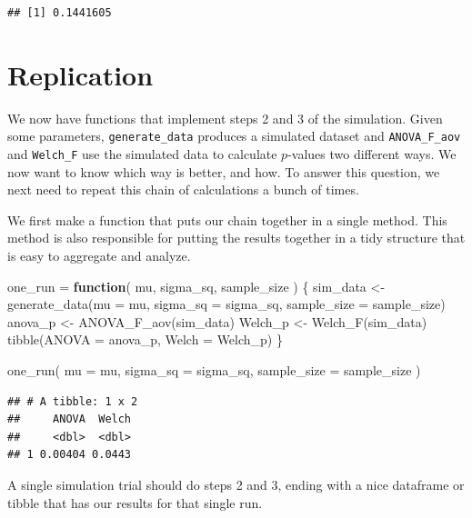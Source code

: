 \documentclass[
]{book}
\newenvironment{Shaded}{\begin{snugshade}}{\end{snugshade}}
\newcommand{\AttributeTok}[1]{\textcolor[rgb]{0.77,0.63,0.00}{#1}}
\newcommand{\ControlFlowTok}[1]{\textcolor[rgb]{0.13,0.29,0.53}{\textbf{#1}}}
\newcommand{\FunctionTok}[1]{\textcolor[rgb]{0.00,0.00,0.00}{#1}}
\newcommand{\NormalTok}[1]{#1}
\newcommand{\OtherTok}[1]{\textcolor[rgb]{0.56,0.35,0.01}{#1}}
\begin{document}
\begin{verbatim}
## [1] 0.1441605
\end{verbatim}

\hypertarget{replication}{%
\section{Replication}\label{replication}}

We now have functions that implement steps 2 and 3 of the simulation.
Given some parameters, \texttt{generate\_data} produces a simulated dataset and \texttt{ANOVA\_F\_aov} and \texttt{Welch\_F} use the simulated data to calculate \(p\)-values two different ways.
We now want to know which way is better, and how.
To answer this question, we next need to repeat this chain of calculations a bunch of times.

We first make a function that puts our chain together in a single method.
This method is also responsible for putting the results together in a tidy structure that is easy to aggregate and analyze.

\begin{Shaded}
\begin{Highlighting}[]
\NormalTok{one\_run }\OtherTok{=} \ControlFlowTok{function}\NormalTok{( mu, sigma\_sq, sample\_size ) \{}
\NormalTok{  sim\_data }\OtherTok{\textless{}{-}} \FunctionTok{generate\_data}\NormalTok{(}\AttributeTok{mu =}\NormalTok{ mu, }\AttributeTok{sigma\_sq =}\NormalTok{ sigma\_sq,}
                            \AttributeTok{sample\_size =}\NormalTok{ sample\_size)}
\NormalTok{  anova\_p }\OtherTok{\textless{}{-}} \FunctionTok{ANOVA\_F\_aov}\NormalTok{(sim\_data)}
\NormalTok{  Welch\_p }\OtherTok{\textless{}{-}} \FunctionTok{Welch\_F}\NormalTok{(sim\_data)}
  \FunctionTok{tibble}\NormalTok{(}\AttributeTok{ANOVA =}\NormalTok{ anova\_p, }\AttributeTok{Welch =}\NormalTok{ Welch\_p)}
\NormalTok{\}}

\FunctionTok{one\_run}\NormalTok{( }\AttributeTok{mu =}\NormalTok{ mu, }\AttributeTok{sigma\_sq =}\NormalTok{ sigma\_sq, }\AttributeTok{sample\_size =}\NormalTok{ sample\_size )}
\end{Highlighting}
\end{Shaded}

\begin{verbatim}
## # A tibble: 1 x 2
##     ANOVA  Welch
##     <dbl>  <dbl>
## 1 0.00404 0.0443
\end{verbatim}

A single simulation trial should do steps 2 and 3, ending with a nice dataframe or tibble that has our results for that single run.
\end{document}
